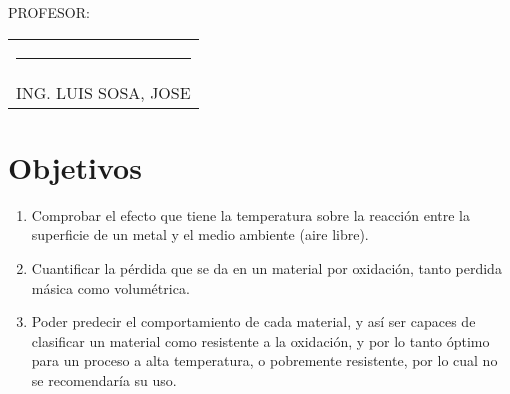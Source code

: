 \documentclass[a4paper,12pt]{report}
\begin{document}
{\large PROFESOR:} \\[1.15cm]
\begin{center}
\begin{tabular}{c}
\rule[3pt]{4.8in}{1pt}\\[1pt]
ING. LUIS SOSA, JOSE 
\end{tabular}
\end{center}
\vfill
\newpage
\tableofcontents
\listoffigures
{}
\chapter{Objetivos}
\begin{enumerate}
\item Comprobar el efecto que tiene la temperatura sobre la reacción entre la superficie de un metal y el medio ambiente (aire libre).
\item Cuantificar la pérdida que se da en un material por oxidación, tanto perdida másica como volumétrica.
\item Poder predecir el comportamiento de cada material, y así ser capaces de clasificar un material como resistente a la oxidación, y por lo tanto óptimo para un proceso a alta temperatura, o pobremente resistente, por lo cual no se recomendaría su uso.
\end{enumerate}
\setcounter{page}{1}  %
\end{document}
